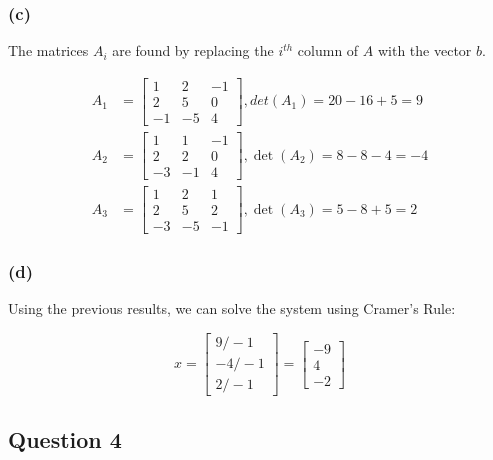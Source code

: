 \documentclass{article}
\begin{document}
\subsubsection*{(c)}

The matrices $A_i$ are found by replacing the $i^{th}$ column of $A$ with
the vector $b$.

\begin{align*}
 A_1 &=
  \begin{bmatrix}
   1 & 2 & -1 \\
   2 & 5 & 0 \\
   -1 & -5 & 4
  \end{bmatrix}, det(A_1) = 20 - 16 + 5 = 9 \\
 A_2 &=
  \begin{bmatrix}
   1 & 1 & -1 \\
   2 & 2 & 0 \\
   -3 & -1 & 4
  \end{bmatrix}, \det(A_2) = 8 - 8 - 4 = -4 \\
 A_3 &=
  \begin{bmatrix}
   1 & 2 & 1 \\
   2 & 5 & 2 \\
   -3 & -5 & -1
  \end{bmatrix}, \det(A_3) = 5 - 8 + 5 = 2
\end{align*}

\subsubsection*{(d)}

Using the previous results, we can solve the system using Cramer's Rule:

\[
 x =
 \begin{bmatrix} 9/-1 \\ -4/-1 \\ 2/-1 \end{bmatrix} =
 \begin{bmatrix} -9 \\ 4 \\ -2 \end{bmatrix}
\]

\subsection*{Question 4}
\end{document}
